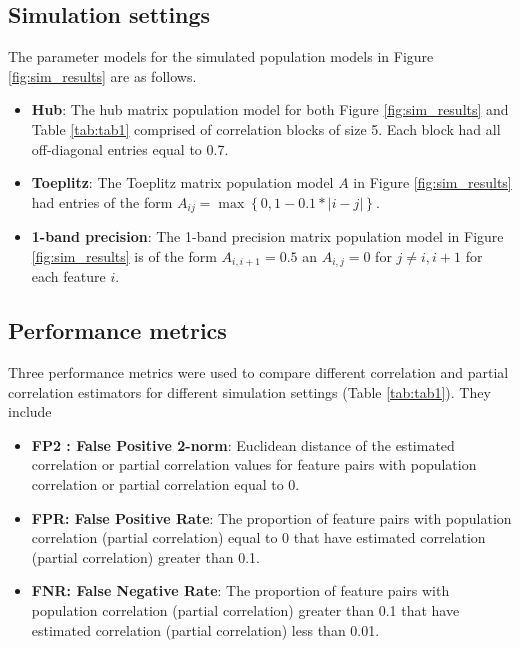 \subsection*{Simulation settings}

The parameter models for the simulated population models in Figure \ref{fig:sim_results} are as follows.

\begin{itemize}
    \item \textbf{Hub}: The hub matrix population model for both Figure \ref{fig:sim_results} and Table \ref{tab:tab1} comprised of correlation blocks of size 5. Each block had all off-diagonal entries equal to 0.7.
    
    \item \textbf{Toeplitz}: The Toeplitz matrix population model $A$ in Figure \ref{fig:sim_results} had entries of the form $A_{ij} = \max \left \{0, 1 - 0.1*|i-j| \right \}$.
    
    \item \textbf{1-band precision}: The 1-band precision matrix population model in Figure \ref{fig:sim_results} is of the form 
    $A_{i,i+1}=0.5$ an $A_{i,j} = 0$ for $j \neq i, i+1$ for each feature $i$.
\end{itemize}


\subsection*{Performance metrics}

Three performance metrics were used to compare different correlation and partial correlation estimators for different simulation settings (Table \ref{tab:tab1}). They include

\begin{itemize}
    \item \textbf{FP2 : False Positive 2-norm}: Euclidean distance of the estimated correlation or partial correlation values for feature pairs with population correlation or partial correlation equal to 0.
    
    \item \textbf{FPR: False Positive Rate}: The proportion of feature pairs with population correlation (partial correlation) equal to 0 that have estimated correlation (partial correlation) greater than 0.1.
    
    \item \textbf{FNR: False Negative Rate}: The proportion of feature pairs with population correlation (partial correlation) greater than 0.1 that have estimated correlation (partial correlation) less than 0.01.
\end{itemize}


